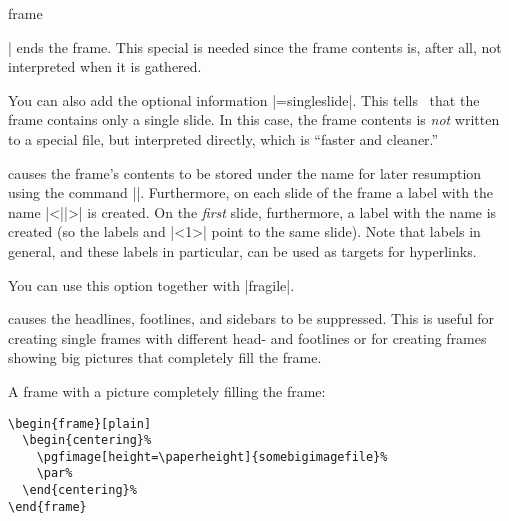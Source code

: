 \begin{environment}{{frame}%
    }
\begin{frame}[<+->][plain]
|
    ends the frame. This special is needed since the frame contents
    is, after all, not interpreted when it is gathered.

    You can also add the optional information |=singleslide|. This
    tells \beamer\ that the frame contains only a single slide. In
    this case, the frame contents is \emph{not} written to a special
    file, but interpreted directly, which is ``faster and cleaner.''
  \item
     causes the frame's contents to
    be stored under the name  for later resumption using
    the command |\againframe|. Furthermore, on each slide of the frame
    a label with the name |<||>| is created. On the
    \emph{first} slide, furthermore, a label with the name 
    is created (so the labels  and |<1>| point
    to the same slide). Note that labels in general, and these labels
    in particular, can be used as targets for hyperlinks.

    You can use this option together with |fragile|.
  \item
     causes  the headlines, footlines,
    and sidebars to be suppressed. This is useful for creating single
    frames with different head- and footlines or for creating frames
    showing big pictures that completely fill the frame.

  \example A frame with a picture completely filling the frame:  
\begin{verbatim}
\begin{frame}[plain]
  \begin{centering}%
    \pgfimage[height=\paperheight]{somebigimagefile}%
    \par%
  \end{centering}%
\end{frame}
\end{verbatim}
  

\end{frame}
\end{environment}
